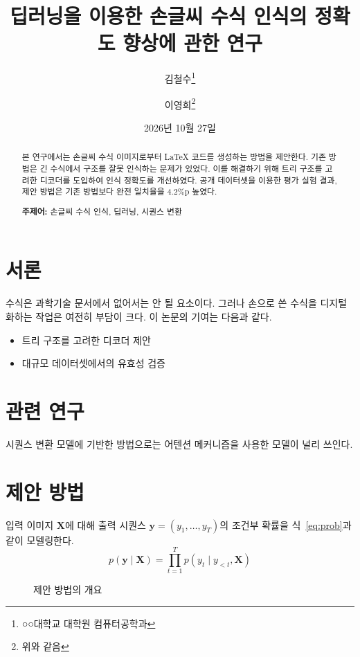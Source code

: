 \documentclass[a4paper,11pt]{article}
\title{딥러닝을 이용한 손글씨 수식 인식의 정확도 향상에 관한 연구}
\author{김철수\thanks{○○대학교 대학원 컴퓨터공학과} \and 이영희\thanks{위와 같음}}
\date{2026년 10월 27일}
\begin{document}
\maketitle

\begin{abstract}
  본 연구에서는 손글씨 수식 이미지로부터 \LaTeX{} 코드를 생성하는 방법을 제안한다.
  기존 방법은 긴 수식에서 구조를 잘못 인식하는 문제가 있었다.
  이를 해결하기 위해 트리 구조를 고려한 디코더를 도입하여 인식 정확도를 개선하였다.
  공개 데이터셋을 이용한 평가 실험 결과, 제안 방법은 기존 방법보다
  완전 일치율을 4.2\%p 높였다.

  \medskip
  \noindent\textbf{주제어:} 손글씨 수식 인식, 딥러닝, 시퀀스 변환
\end{abstract}

\section{서론}
수식은 과학기술 문서에서 없어서는 안 될 요소이다.
그러나 손으로 쓴 수식을 디지털화하는 작업은 여전히 부담이 크다\cite{zhang2017}.
이 논문의 기여는 다음과 같다.
\begin{itemize}
  \item 트리 구조를 고려한 디코더 제안
  \item 대규모 데이터셋에서의 유효성 검증
\end{itemize}

\section{관련 연구}
시퀀스 변환 모델에 기반한 방법으로는 어텐션 메커니즘을 사용한 모델이 널리 쓰인다\cite{vaswani2017}.

\section{제안 방법}
입력 이미지 $\mathbf{X}$에 대해 출력 시퀀스 $\mathbf{y} = (y_1, \dots, y_T)$의 조건부 확률을
식~\eqref{eq:prob}과 같이 모델링한다.
\begin{equation}
  p(\mathbf{y} \mid \mathbf{X}) = \prod_{t=1}^{T} p(y_t \mid y_{<t}, \mathbf{X})
  \label{eq:prob}
\end{equation}

\begin{figure}[tb]
  \centering
  \caption{제안 방법의 개요}
  \label{fig:overview}
\end{figure}
\end{document}
